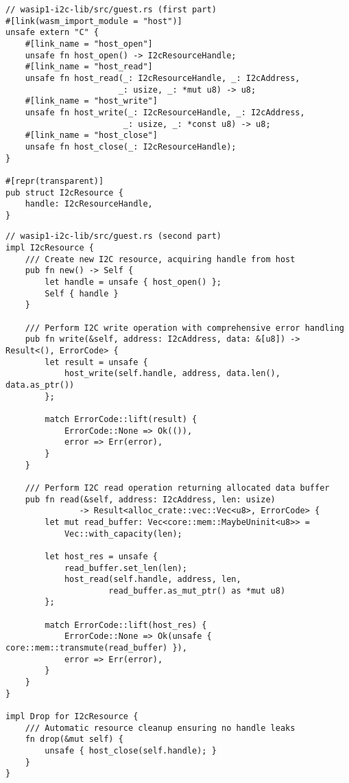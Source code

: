 \begin{verbatim}
// wasip1-i2c-lib/src/guest.rs (first part)
#[link(wasm_import_module = "host")]
unsafe extern "C" {
    #[link_name = "host_open"]
    unsafe fn host_open() -> I2cResourceHandle;
    #[link_name = "host_read"]
    unsafe fn host_read(_: I2cResourceHandle, _: I2cAddress, 
                       _: usize, _: *mut u8) -> u8;
    #[link_name = "host_write"]
    unsafe fn host_write(_: I2cResourceHandle, _: I2cAddress, 
                        _: usize, _: *const u8) -> u8;
    #[link_name = "host_close"]
    unsafe fn host_close(_: I2cResourceHandle);
}

#[repr(transparent)]
pub struct I2cResource {
    handle: I2cResourceHandle,
}
\end{verbatim}

\begin{verbatim}
// wasip1-i2c-lib/src/guest.rs (second part)
impl I2cResource {
    /// Create new I2C resource, acquiring handle from host
    pub fn new() -> Self {
        let handle = unsafe { host_open() };
        Self { handle }
    }

    /// Perform I2C write operation with comprehensive error handling
    pub fn write(&self, address: I2cAddress, data: &[u8]) -> Result<(), ErrorCode> {
        let result = unsafe {
            host_write(self.handle, address, data.len(), data.as_ptr())
        };
        
        match ErrorCode::lift(result) {
            ErrorCode::None => Ok(()),
            error => Err(error),
        }
    }

    /// Perform I2C read operation returning allocated data buffer
    pub fn read(&self, address: I2cAddress, len: usize) 
               -> Result<alloc_crate::vec::Vec<u8>, ErrorCode> {
        let mut read_buffer: Vec<core::mem::MaybeUninit<u8>> = 
            Vec::with_capacity(len);

        let host_res = unsafe {
            read_buffer.set_len(len);
            host_read(self.handle, address, len, 
                     read_buffer.as_mut_ptr() as *mut u8)
        };

        match ErrorCode::lift(host_res) {
            ErrorCode::None => Ok(unsafe { core::mem::transmute(read_buffer) }),
            error => Err(error),
        }
    }
}

impl Drop for I2cResource {
    /// Automatic resource cleanup ensuring no handle leaks
    fn drop(&mut self) {
        unsafe { host_close(self.handle); }
    }
}
\end{verbatim}

